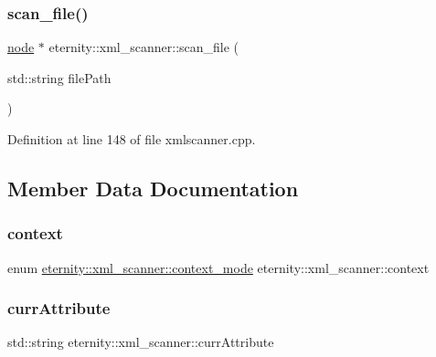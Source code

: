 \subsubsection{\texorpdfstring{scan\+\_\+file()}{scan\_file()}}
{\footnotesize\ttfamily \hyperlink{classeternity_1_1node}{node} $\ast$ eternity\+::xml\+\_\+scanner\+::scan\+\_\+file (\begin{DoxyParamCaption}\item[{std\+::string}]{file\+Path }\end{DoxyParamCaption})}



Definition at line 148 of file xmlscanner.\+cpp.



\subsection{Member Data Documentation}
\mbox{\label{classeternity_1_1xml__scanner_ab1eb4acdc4a28ccd587413bcc504aa01}} 
\subsubsection{\texorpdfstring{context}{context}}
{\footnotesize\ttfamily enum \hyperlink{classeternity_1_1xml__scanner_a97fff18c2e2004f157a42001010b84cf}{eternity\+::xml\+\_\+scanner\+::context\+\_\+mode}  eternity\+::xml\+\_\+scanner\+::context\hspace{0.3cm}{\ttfamily [private]}}

\mbox{\label{classeternity_1_1xml__scanner_afe2104df644a31c03e948a9f1e4203b1}} 
\subsubsection{\texorpdfstring{curr\+Attribute}{currAttribute}}
{\footnotesize\ttfamily std\+::string eternity\+::xml\+\_\+scanner\+::curr\+Attribute\hspace{0.3cm}{\ttfamily [private]}}



